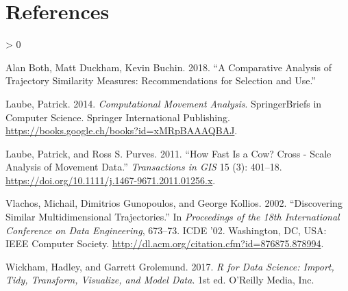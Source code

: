 \documentclass[
]{book}
\newlength{\cslhangindent}
\newenvironment{CSLReferences}[2] %
 {%
  \setlength{\parindent}{0pt}
  \ifodd #1 \everypar{\setlength{\hangindent}{\cslhangindent}}\ignorespaces\fi
  \ifnum #2 > 0
  \setlength{\parskip}{#2\baselineskip}
  \fi
 }%
 {}
\begin{document}
\hypertarget{references}{%
\chapter*{References}\label{references}}

\hypertarget{refs}{}
\begin{CSLReferences}{1}{0}
\leavevmode\hypertarget{ref-both2018}{}%
Alan Both, Matt Duckham, Kevin Buchin. 2018. {``A Comparative Analysis of Trajectory Similarity Measures: Recommendations for Selection and Use.''}

\leavevmode\hypertarget{ref-laube2014}{}%
Laube, Patrick. 2014. \emph{Computational Movement Analysis}. SpringerBriefs in Computer Science. Springer International Publishing. \url{https://books.google.ch/books?id=xMRpBAAAQBAJ}.

\leavevmode\hypertarget{ref-laube2011}{}%
Laube, Patrick, and Ross S. Purves. 2011. {``How Fast Is a Cow? Cross - Scale Analysis of Movement Data.''} \emph{Transactions in GIS} 15 (3): 401--18. \url{https://doi.org/10.1111/j.1467-9671.2011.01256.x}.

\leavevmode\hypertarget{ref-vlachos2002}{}%
Vlachos, Michail, Dimitrios Gunopoulos, and George Kollios. 2002. {``Discovering Similar Multidimensional Trajectories.''} In \emph{Proceedings of the 18th International Conference on Data Engineering}, 673--73. ICDE '02. Washington, DC, USA: IEEE Computer Society. \url{http://dl.acm.org/citation.cfm?id=876875.878994}.

\leavevmode\hypertarget{ref-wickham2017}{}%
Wickham, Hadley, and Garrett Grolemund. 2017. \emph{R for Data Science: Import, Tidy, Transform, Visualize, and Model Data}. 1st ed. O'Reilly Media, Inc.

\end{CSLReferences}
\end{document}
